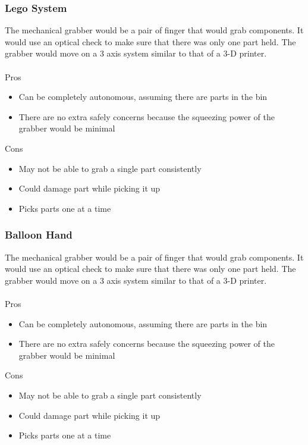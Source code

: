 \documentclass[12pt]{report}
\begin{document}
\subsubsection*{Lego System}
The mechanical grabber would be a pair of finger that would grab components. It would use an optical check to make sure that there was only one part held. The grabber would move on a 3 axis system similar to that of a 3-D printer. \\ \\
Pros
\begin{itemize}
\item Can be completely autonomous, assuming there are parts in the bin
\item There are no extra safely concerns because the squeezing power of the grabber would be minimal
\end{itemize}
Cons
\begin{itemize}
\item May not be able to grab a single part consistently
\item Could damage part while picking it up
\item Picks parts one at a time
\end{itemize}

\subsubsection*{Balloon Hand}
The mechanical grabber would be a pair of finger that would grab components. It would use an optical check to make sure that there was only one part held. The grabber would move on a 3 axis system similar to that of a 3-D printer. \\ \\
Pros
\begin{itemize}
\item Can be completely autonomous, assuming there are parts in the bin
\item There are no extra safely concerns because the squeezing power of the grabber would be minimal
\end{itemize}
Cons
\begin{itemize}
\item May not be able to grab a single part consistently
\item Could damage part while picking it up
\item Picks parts one at a time
\end{itemize}
\end{document}
